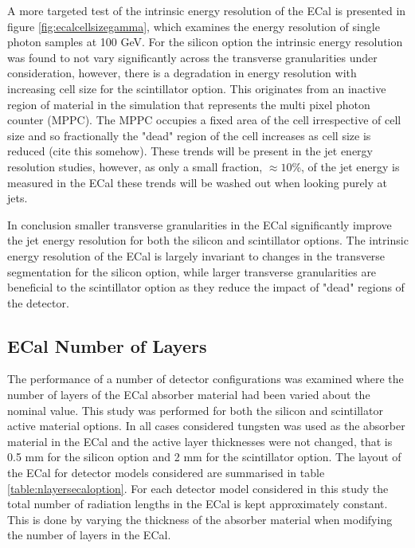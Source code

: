 A more targeted test of the intrinsic energy resolution of the ECal is presented in figure \ref{fig:ecalcellsizegamma}, which examines the energy resolution of single photon samples at 100 GeV.  For the silicon option the intrinsic energy resolution was found to not vary significantly across the transverse granularities under consideration, however, there is a degradation in energy resolution with increasing cell size for the scintillator option.  This originates from an inactive region of material in the simulation that represents the multi pixel photon counter (MPPC).  The MPPC occupies a fixed area of the cell irrespective of cell size and so fractionally the "dead" region of the cell increases as cell size is reduced (cite this somehow).  These trends will be present in the jet energy resolution studies, however, as only a small fraction, $\approx 10$\%, of the jet energy is measured in the ECal these trends will be washed out when looking purely at jets.

In conclusion smaller transverse granularities in the ECal significantly improve the jet energy resolution for both the silicon and scintillator options.  The intrinsic energy resolution of the ECal is largely invariant to changes in the transverse segmentation for the silicon option, while larger transverse granularities are beneficial to the scintillator option as they reduce the impact of "dead" regions of the detector.  


\subsection{ECal Number of Layers}
\label{sec:ecalnlayers}
The performance of a number of detector configurations was examined where the number of layers of the ECal absorber material had been varied about the nominal value.  This study was performed for both the silicon and scintillator active material options.  In all cases considered tungsten was used as the absorber material in the ECal and the active layer thicknesses were not changed, that is 0.5 mm for the silicon option and 2 mm for the scintillator option.  The layout of the ECal for detector models considered are summarised in table \ref{table:nlayersecaloption}.  For each detector model considered in this study the total number of radiation lengths in the ECal is kept approximately constant.  This is done by varying the thickness of the absorber material when modifying the number of layers in the ECal. 


